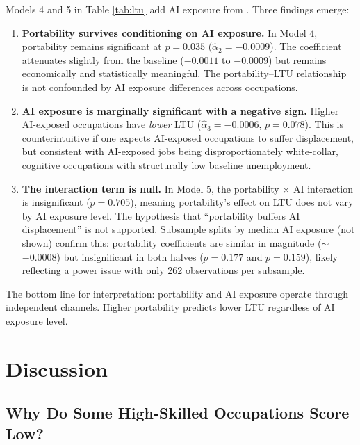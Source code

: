 \documentclass[12pt]{article}
\begin{document}
Models 4 and 5 in Table \ref{tab:ltu} add AI exposure from \citet{eloundou2023}. Three findings emerge:

\begin{enumerate}
    \item \textbf{Portability survives conditioning on AI exposure.} In Model 4, portability remains significant at $p = 0.035$ ($\hat{\alpha}_2 = -0.0009$). The coefficient attenuates slightly from the baseline ($-0.0011$ to $-0.0009$) but remains economically and statistically meaningful. The portability--LTU relationship is not confounded by AI exposure differences across occupations.

    \item \textbf{AI exposure is marginally significant with a negative sign.} Higher AI-exposed occupations have \emph{lower} LTU ($\hat{\alpha}_3 = -0.0006$, $p = 0.078$). This is counterintuitive if one expects AI-exposed occupations to suffer displacement, but consistent with AI-exposed jobs being disproportionately white-collar, cognitive occupations with structurally low baseline unemployment.

    \item \textbf{The interaction term is null.} In Model 5, the portability $\times$ AI interaction is insignificant ($p = 0.705$), meaning portability's effect on LTU does not vary by AI exposure level. The hypothesis that ``portability buffers AI displacement'' is not supported. Subsample splits by median AI exposure (not shown) confirm this: portability coefficients are similar in magnitude ($\sim$$-0.0008$) but insignificant in both halves ($p = 0.177$ and $p = 0.159$), likely reflecting a power issue with only 262 observations per subsample.
\end{enumerate}

The bottom line for interpretation: portability and AI exposure operate through independent channels. Higher portability predicts lower LTU regardless of AI exposure level.

\section{Discussion}
\label{sec:discussion}

\subsection{Why Do Some High-Skilled Occupations Score Low?}
\end{document}
